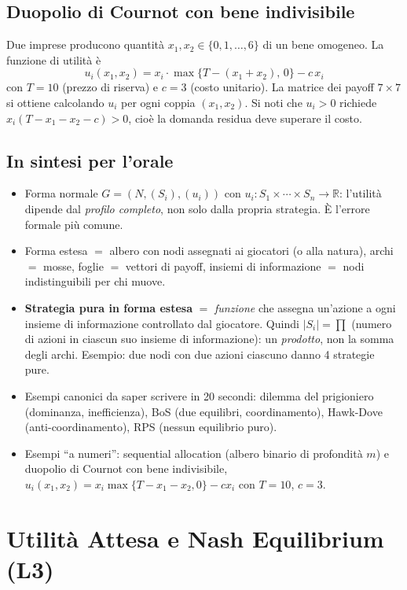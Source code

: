 \documentclass[12pt,a4paper,twoside]{book}
\theoremstyle{plain}
\theoremstyle{definition}
\begin{document}
\section{Duopolio di Cournot con bene indivisibile}

Due imprese producono quantità $x_1,x_2\in\{0,1,\dots,6\}$ di un bene omogeneo. La funzione di utilità è
\[
  u_i(x_1,x_2) = x_i \cdot \max\{T-(x_1+x_2),\,0\} - c\,x_i
\]
con $T=10$ (prezzo di riserva) e $c=3$ (costo unitario). La matrice dei payoff $7\times 7$ si ottiene calcolando $u_i$ per ogni coppia $(x_1,x_2)$. Si noti che $u_i > 0$ richiede $x_i(T-x_1-x_2-c)>0$, cioè la domanda residua deve superare il costo.

\section*{In sintesi per l'orale}
\begin{itemize}
  \item Forma normale $G=(N,(S_i),(u_i))$ con $u_i:S_1\times\cdots\times S_n\to\mathbb{R}$: l'utilità dipende dal \emph{profilo completo}, non solo dalla propria strategia. È l'errore formale più comune.
  \item Forma estesa $=$ albero con nodi assegnati ai giocatori (o alla natura), archi $=$ mosse, foglie $=$ vettori di payoff, insiemi di informazione $=$ nodi indistinguibili per chi muove.
  \item \textbf{Strategia pura in forma estesa} $=$ \emph{funzione} che assegna un'azione a ogni insieme di informazione controllato dal giocatore. Quindi $|S_i|=\prod$ (numero di azioni in ciascun suo insieme di informazione): un \emph{prodotto}, non la somma degli archi. Esempio: due nodi con due azioni ciascuno danno 4 strategie pure.
  \item Esempi canonici da saper scrivere in 20 secondi: dilemma del prigioniero (dominanza, inefficienza), BoS (due equilibri, coordinamento), Hawk-Dove (anti-coordinamento), RPS (nessun equilibrio puro).
  \item Esempi ``a numeri'': sequential allocation (albero binario di profondità $m$) e duopolio di Cournot con bene indivisibile, $u_i(x_1,x_2)=x_i\max\{T-x_1-x_2,0\}-cx_i$ con $T=10$, $c=3$.
\end{itemize}

\chapter{Utilità Attesa e Nash Equilibrium (L3)}
\end{document}
